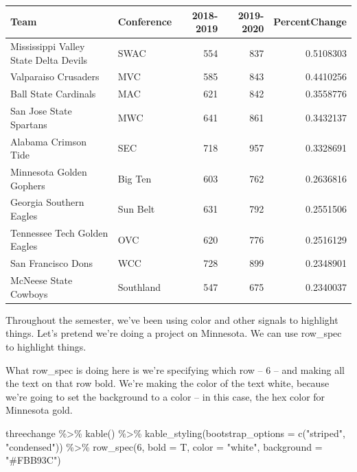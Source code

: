 \documentclass[
]{book}
\newenvironment{Shaded}{\begin{snugshade}}{\end{snugshade}}
\newcommand{\AttributeTok}[1]{\textcolor[rgb]{0.77,0.63,0.00}{#1}}
\newcommand{\DecValTok}[1]{\textcolor[rgb]{0.00,0.00,0.81}{#1}}
\newcommand{\FunctionTok}[1]{\textcolor[rgb]{0.00,0.00,0.00}{#1}}
\newcommand{\NormalTok}[1]{#1}
\newcommand{\SpecialCharTok}[1]{\textcolor[rgb]{0.00,0.00,0.00}{#1}}
\newcommand{\StringTok}[1]{\textcolor[rgb]{0.31,0.60,0.02}{#1}}
\begin{document}
\begin{table}[H]
\centering
\begin{tabular}{l|l|r|r|r}
\hline
Team & Conference & 2018-2019 & 2019-2020 & PercentChange\\
\hline
Mississippi Valley State Delta Devils & SWAC & 554 & 837 & 0.5108303\\
\hline
Valparaiso Crusaders & MVC & 585 & 843 & 0.4410256\\
\hline
Ball State Cardinals & MAC & 621 & 842 & 0.3558776\\
\hline
San Jose State Spartans & MWC & 641 & 861 & 0.3432137\\
\hline
Alabama Crimson Tide & SEC & 718 & 957 & 0.3328691\\
\hline
Minnesota Golden Gophers & Big Ten & 603 & 762 & 0.2636816\\
\hline
Georgia Southern Eagles & Sun Belt & 631 & 792 & 0.2551506\\
\hline
Tennessee Tech Golden Eagles & OVC & 620 & 776 & 0.2516129\\
\hline
San Francisco Dons & WCC & 728 & 899 & 0.2348901\\
\hline
McNeese State Cowboys & Southland & 547 & 675 & 0.2340037\\
\hline
\end{tabular}
\end{table}

Throughout the semester, we've been using color and other signals to highlight things. Let's pretend we're doing a project on Minnesota. We can use row\_spec to highlight things.

What row\_spec is doing here is we're specifying which row -- 6 -- and making all the text on that row bold. We're making the color of the text white, because we're going to set the background to a color -- in this case, the hex color for Minnesota gold.

\begin{Shaded}
\begin{Highlighting}[]
\NormalTok{threechange }\SpecialCharTok{\%\textgreater{}\%} 
  \FunctionTok{kable}\NormalTok{() }\SpecialCharTok{\%\textgreater{}\%} 
  \FunctionTok{kable\_styling}\NormalTok{(}\AttributeTok{bootstrap\_options =} \FunctionTok{c}\NormalTok{(}\StringTok{"striped"}\NormalTok{, }\StringTok{"condensed"}\NormalTok{)) }\SpecialCharTok{\%\textgreater{}\%}
  \FunctionTok{row\_spec}\NormalTok{(}\DecValTok{6}\NormalTok{, }\AttributeTok{bold =}\NormalTok{ T, }\AttributeTok{color =} \StringTok{"white"}\NormalTok{, }\AttributeTok{background =} \StringTok{"\#FBB93C"}\NormalTok{)}
\end{Highlighting}
\end{Shaded}
\end{document}
